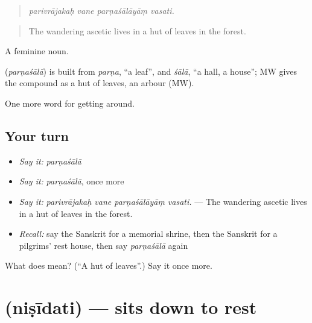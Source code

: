 \begin{quote}
   
\end{quote}

\begin{quote}
\emph{parivrājakaḥ vane parṇaśālāyāṃ vasati.}
\end{quote}

\begin{quote}
The wandering ascetic lives in a hut of leaves in the forest.
\end{quote}

A feminine noun.

\begin{cousinweb}
\textbf{} (\emph{parṇaśālā}) is built from \emph{parṇa}, \textquotedblleft{}a leaf\textquotedblright{}, and \emph{śālā}, \textquotedblleft{}a hall, a house\textquotedblright{}; MW gives the compound as a hut of leaves, an arbour (MW).
\end{cousinweb}

\begin{grammarlens}[title={What you've built}]
One more word for getting around.
\end{grammarlens}

\subsection*{Your turn}
\begin{itemize}
\raggedright
  \item \emph{Say it:} \emph{parṇaśālā}
  \item \emph{Say it:} \emph{parṇaśālā}, once more
  \item \emph{Say it:} \emph{parivrājakaḥ vane parṇaśālāyāṃ vasati.} — The wandering ascetic lives in a hut of leaves in the forest.
  \item \emph{Recall:} say the Sanskrit for a memorial shrine, then the Sanskrit for a pilgrims' rest house, then say \emph{parṇaśālā} again
\end{itemize}

\begin{tcolorbox}[breakable,colback=teal!4,colframe=teal!35!black,title={Before you move on}]
What does  mean? (\textquotedblleft{}A hut of leaves\textquotedblright{}.) Say it once more.
\end{tcolorbox}
\section[\texorpdfstring{\sk{निषीदति} (niṣīdati)}{निषीदति (niṣīdati)}]{ (niṣīdati) — sits down to rest}

